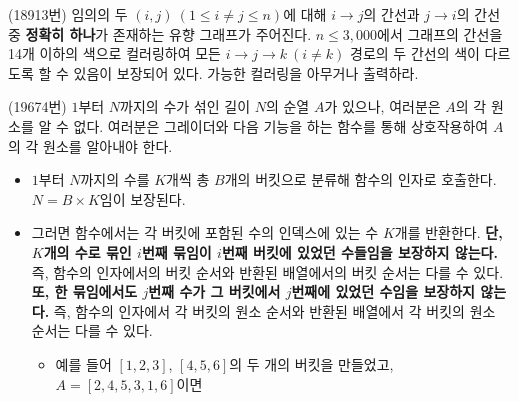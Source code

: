 \begin{problem}
    (18913번) 임의의 두 $(i, j)~(1 \leq i \neq j \leq n)$에 대해 $i \rightarrow j$의 간선과 $j \rightarrow i$의 간선 중 \textbf{정확히 하나}가 존재하는 유향 그래프가 주어진다. $n \leq 3,000$에서 그래프의 간선을 14개 이하의 색으로 컬러링하여 모든 $i \rightarrow j \rightarrow k~(i \neq k)$ 경로의 두 간선의 색이 다르도록 할 수 있음이 보장되어 있다. 가능한 컬러링을 아무거나 출력하라.
\end{problem}

\begin{problem}
    (19674번) $1$부터 $N$까지의 수가 섞인 길이 $N$의 순열 $A$가 있으나, 여러분은 $A$의 각 원소를 알 수 없다. 여러분은 그레이더와 다음 기능을 하는 함수를 통해 상호작용하여 $A$의 각 원소를 알아내야 한다.
    \begin{itemize}
        \item $1$부터 $N$까지의 수를 $K$개씩 총 $B$개의 버킷으로 분류해 함수의 인자로 호출한다. $N = B \times K$임이 보장된다.
        \item 그러면 함수에서는 각 버킷에 포함된 수의 인덱스에 있는 수 $K$개를 반환한다. \textbf{단, $K$개의 수로 묶인 $i$번째 묶임이 $i$번째 버킷에 있었던 수들임을 보장하지 않는다.} 즉, 함수의 인자에서의 버킷 순서와 반환된 배열에서의 버킷 순서는 다를 수 있다. \textbf{또, 한 묶임에서도 $j$번째 수가 그 버킷에서 $j$번째에 있었던 수임을 보장하지 않는다.} 즉, 함수의 인자에서 각 버킷의 원소 순서와 반환된 배열에서 각 버킷의 원소 순서는 다를 수 있다.
        \begin{itemize}
            \item 예를 들어 $[1, 2, 3]$, $[4, 5, 6]$의 두 개의 버킷을 만들었고, $A = [2, 4, 5, 3, 1, 6]$이면 
            

\end{itemize}
\end{itemize}
\end{problem}
